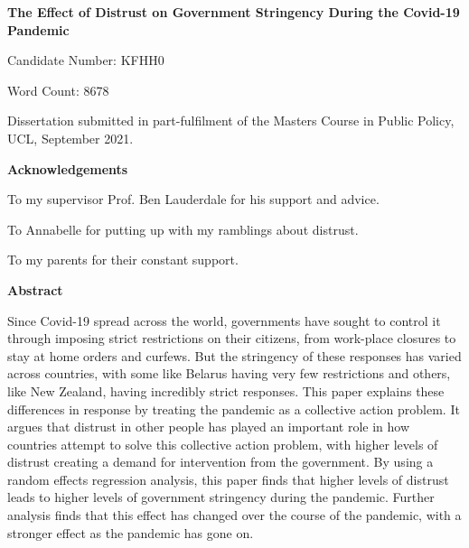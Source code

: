 \begin{titlepage}
\begin{center}
\vspace*{5cm}
\LARGE
\textbf{The Effect of Distrust on Government Stringency During the Covid-19 Pandemic}


\vspace{1.5cm}
\large
Candidate Number: KFHH0

\vspace{0.5cm}
Word Count: 8678

\vfill

Dissertation submitted in part-fulfilment of the Masters Course in Public Policy, UCL,  September 2021.

\end{center}
\end{titlepage}

\begin{center}
\textbf{Acknowledgements}

To my supervisor Prof. Ben Lauderdale for his support and advice.

To Annabelle for putting up with my ramblings about distrust.

To my parents for their constant support.
\end{center}

\pagebreak

\begin{center}
\vspace*{5cm}
\textbf{Abstract}
\end{center}
Since Covid-19 spread across the world, governments have sought to control it through imposing strict restrictions on their citizens, from work-place closures to stay at home orders and curfews. But the stringency of these responses has varied across countries, with some like Belarus having very few restrictions and others, like New Zealand, having incredibly strict responses. This paper explains these differences in response by treating the pandemic as a collective action problem. It argues that distrust in other people has played an important role in how countries attempt to solve this collective action problem, with higher levels of distrust creating a demand for intervention from the government. By using a random effects regression analysis, this paper finds that higher levels of distrust leads to higher levels of government stringency during the pandemic. Further analysis finds that this effect has changed over the course of the pandemic, with a stronger effect as the pandemic has gone on.
\pagebreak